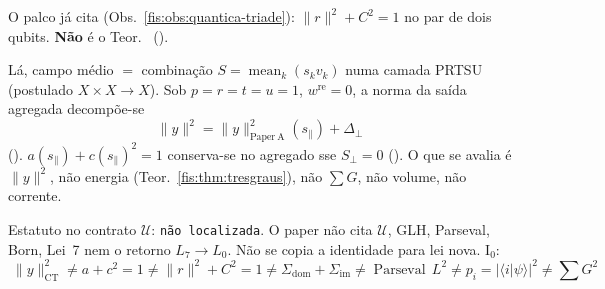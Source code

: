 \documentclass[livro.tex]{subfiles}
\begin{document}
\begin{observacao}[norma agregada do Paper~CT $\neq$ $a+c^{2}=1$ do par]\label{fis:obs:quantica-ct-mf}
O palco já cita
(Obs.~\ref{fis:obs:quantica-triade}):
\(\lVert r\rVert^{2}+C^{2}=1\) no par de dois qubits.
\textbf{Não} é o Teor.~
().

Lá, campo médio $=$ combinação
\(S=\operatorname{mean}_{k}(s_{k}v_{k})\)
numa camada PRTSU (postulado \(X\times X\to X\)).
Sob \(p=r=t=u=1\), \(w^{\mathrm{re}}=0\), a norma da saída
agregada decompõe-se
\[
\boxed{\;
\lVert y\rVert^{2}
=
\lVert y\rVert^{2}_{\mathrm{Paper~A}}(s_{\|})
+\Delta_{\perp}
\;}
\]
().
\(a(s_{\|})+c(s_{\|})^{2}=1\) conserva-se no agregado
sse \(S_{\perp}=0\)
().
O que se avalia é \(\lVert y\rVert^{2}\), não energia
(Teor.~\ref{fis:thm:tresgraus}),
não \(\sum G\), não volume, não corrente.

Estatuto no contrato \(\mathcal{U}\):
\texttt{não localizada}.
O paper não cita \(\mathcal{U}\), GLH, Parseval, Born,
Lei~7 nem o retorno \(L_{7}\to L_{0}\).
Não se copia a identidade para lei nova.
\(\mathrm{I}_{0}\):
\[
\boxed{\;
\lVert y\rVert^{2}_{\mathrm{CT}}
\neq
a+c^{2}=1
\neq
\lVert r\rVert^{2}+C^{2}=1
\neq
\Sigma_{\mathrm{dom}}+\Sigma_{\mathrm{im}}
\neq
\operatorname{Parseval}\,L^{2}
\neq
p_{i}=\lvert\langle i\rvert\psi\rangle\rvert^{2}
\neq
\sum G^{2}
\;}
\]
\end{observacao}
\end{document}
